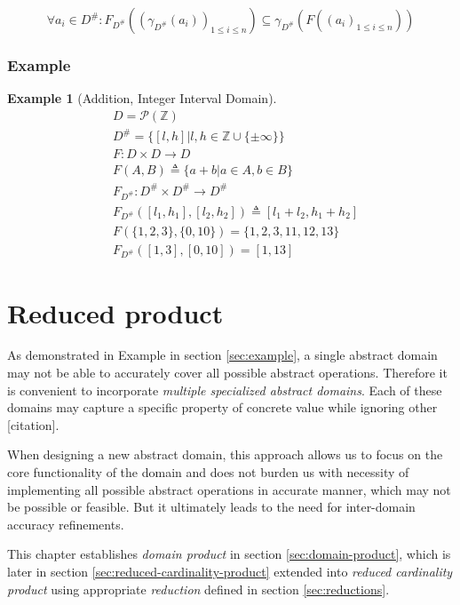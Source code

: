 \documentclass[12pt,oneside]{fithesis2}
\theoremstyle{definition}
\newtheorem{exmp}{Example}[section]
\begin{document}
\[
\forall a_i \in D^\#: F_{D^\#}((\gamma_{D^\#}(a_i))_{1 \le i \le n}) \subseteq \gamma_{D^\#}(F((a_i)_{1 \le i \le n}))
\]

\subsection{Example}

\begin{exmp}[Addition, Integer Interval Domain\cite{mine-WING12}]
  \begin{align*}
    &D = \mathcal P(\mathbb Z)\\
    &D^\# = \{[l,h] | l,h \in \mathbb{Z} \cup \{\pm\infty\}\}\\
    &F: D \times D \to D\\
    &F(A,B) \triangleq \{a+b | a \in A, b \in B \}\\
    &F_{D^\#}: D^\# \times D^\# \to D^\#\\
    &F_{D^\#}([l_1, h_1], [l_2, h_2]) \triangleq [l_1 + l_2, h_1 + h_2]\\
    &F(\{1,2,3\}, \{0,10\}) = \{1,2,3,11,12,13\}\\
    &F_{D^\#}([1,3], [0,10]) = [1,13]
  \end{align*}
\end{exmp}

\chapter{Reduced product}

As demonstrated in Example in section \ref{sec:example}, a single abstract domain may not be able to accurately cover all possible abstract operations. Therefore it is convenient to incorporate \textit{multiple specialized abstract domains}. Each of these domains may capture a specific property of concrete value while ignoring other [citation].

When designing a new abstract domain, this approach allows us to focus on the core functionality of the domain and does not burden us with necessity of implementing all possible abstract operations in accurate manner, which may not be possible or feasible. But it ultimately leads to the need for inter-domain accuracy refinements.

This chapter establishes \textit{domain product} in section \ref{sec:domain-product}, which is later in section \ref{sec:reduced-cardinality-product} extended into \textit{reduced cardinality product} using appropriate \textit{reduction} defined in section \ref{sec:reductions}.
\end{document}
